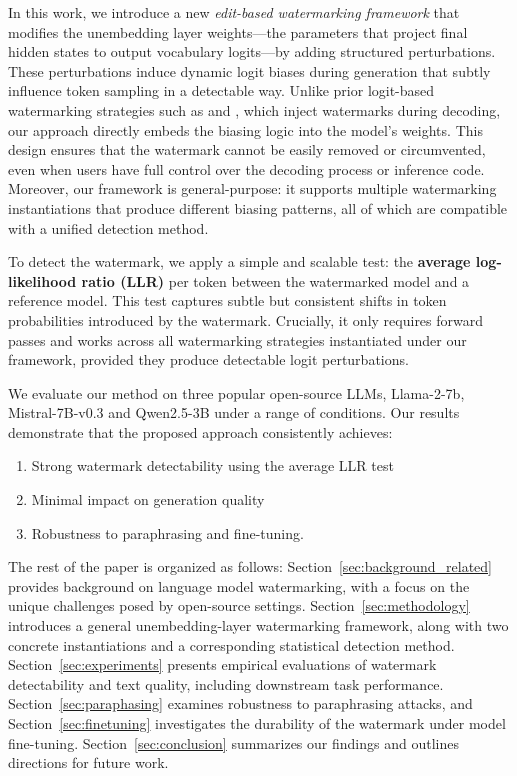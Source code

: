 In this work, we introduce a new
\emph{edit-based watermarking framework} that modifies the unembedding layer weights—the parameters that project final hidden states to output vocabulary logits—by adding structured perturbations. These perturbations induce dynamic logit biases during generation that subtly influence token sampling in a detectable way. Unlike prior logit-based watermarking strategies such as \citet{kirchenbauer2023watermark} and \citet{liu2024adaptive}, which inject watermarks during decoding, our approach directly embeds the biasing logic into the model's weights. This design ensures that the watermark cannot be easily removed or circumvented, even when users have full control over the decoding process or inference code. Moreover, our framework is general-purpose: it supports multiple watermarking instantiations that produce different biasing patterns, all of which are compatible with a unified detection method.

To detect the watermark, we apply a simple and scalable test: the \textbf{average log-likelihood ratio (LLR)} per token between the watermarked model and a reference model.
This test captures subtle but consistent shifts in token probabilities introduced by the watermark. Crucially, it only requires forward passes and works across all watermarking strategies instantiated under our framework, provided they produce detectable logit perturbations.

We evaluate our method on three popular open-source LLMs, Llama-2-7b, Mistral-7B-v0.3 and Qwen2.5-3B under a range of conditions. Our results demonstrate that the proposed approach consistently achieves:

\begin{enumerate}

    \item Strong watermark detectability using the average LLR test

    \item Minimal impact on generation quality

    \item Robustness to paraphrasing and fine-tuning.

\end{enumerate}

The rest of the paper is organized as follows: Section~\ref{sec:background_related} provides background on language model watermarking, with a focus on the unique challenges posed by open-source settings. Section~\ref{sec:methodology} introduces a general unembedding-layer watermarking framework, along with two concrete instantiations and a corresponding statistical detection method. Section~\ref{sec:experiments} presents empirical evaluations of watermark detectability and text quality, including downstream task performance. Section~\ref{sec:paraphasing} examines robustness to paraphrasing attacks, and Section~\ref{sec:finetuning} investigates the durability of the watermark under model fine-tuning. Section~\ref{sec:conclusion} summarizes our findings and outlines directions for future work.